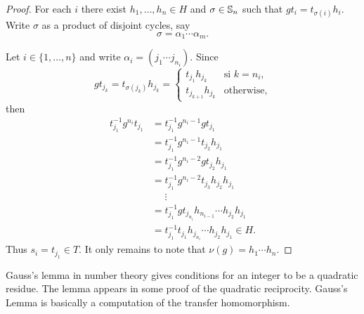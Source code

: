 \begin{proof}
	For each $i$ there exist $h_1,\dots,h_n\in H$ and $\sigma\in\mathbb{S}_n$ such that 
	$gt_i=t_{\sigma(i)}h_i$. Write $\sigma$ as a product of disjoint cycles, say 
	\[
		\sigma=\alpha_1\cdots\alpha_m.
	\]

	Let $i\in\{1,\dots,n\}$ and write 
	$\alpha_i=(j_{1}\cdots j_{n_i})$. Since   
	\[
		g t_{j_k}=t_{\sigma(j_k)}h_{j_k}=\begin{cases}
			t_{j_1}h_{j_k} & \text{si $k=n_i$},\\
			t_{j_{k+1}}h_{j_k} & \text{otherwise},
		\end{cases}
	\]
	then 
	\begin{align*}
	t_{j_1}^{-1}g^{n_i}t_{j_1}
	&=t_{j_1}^{-1}g^{n_i-1}gt_{j_1}\\
	&=t_{j_1}^{-1}g^{n_i-1}t_{j_2}h_{j_1}\\
	&=t_{j_1}^{-1}g^{n_i-2}gt_{j_2}h_{j_1}\\
	&=t_{j_1}^{-1}g^{n_i-2}t_{j_3}h_{j_2}h_{j_1}\\
	&\phantom{=}\vdots\\
	&=t_{j_1}^{-1}gt_{j_{n_i}}h_{n_{i-1}}\cdots h_{j_2}h_{j_1}\\
	&=t_{j_1}^{-1}t_{j_1}h_{j_{n_i}}\cdots h_{j_2}h_{j_1}\in H. 	
	\end{align*}
	Thus $s_i=t_{j_1}\in T$. It only remains to note that $\nu(g)=h_1\cdots h_n$. 
\end{proof}


Gauss's lemma in number theory gives conditions for an integer to be a quadratic residue. The lemma appears in some proof of the quadratic reciprocity. Gauss's Lemma is basically a computation of the transfer homomorphism. 

